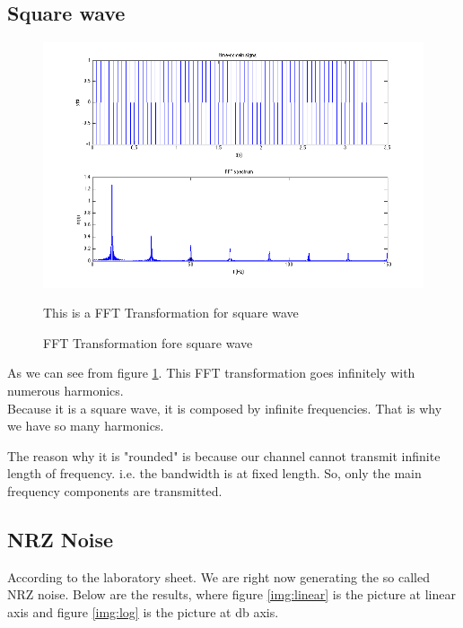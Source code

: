 \documentclass[11pt]{article}
\begin{document}
\subsection{Square wave}
\FloatBarrier
\begin{figure}[h!]
\includegraphics[scale=0.5]{elec_4.png}
\caption{FFT Transformation fore square wave}

\label{img:square}
\begin{minipage}{0.75\textwidth}
{\footnotesize This is a FFT Transformation for square wave}
\end{minipage}
\end{figure}
\FloatBarrier
As we can see from figure \ref{img:square}. This FFT transformation goes infinitely with numerous harmonics. \\

Because it is a square wave, it is composed by infinite frequencies. That is why we have so many harmonics.

The reason why it is "rounded" is because our channel cannot transmit infinite length of frequency. i.e. the bandwidth is at fixed length. So, only the main frequency components are transmitted.  

\subsection{NRZ Noise}

According to the laboratory sheet. We are right now generating the so called NRZ noise. Below are the results, where figure \ref{img:linear} is the picture at linear axis and figure \ref{img:log} is the picture at db axis.
\end{document}
